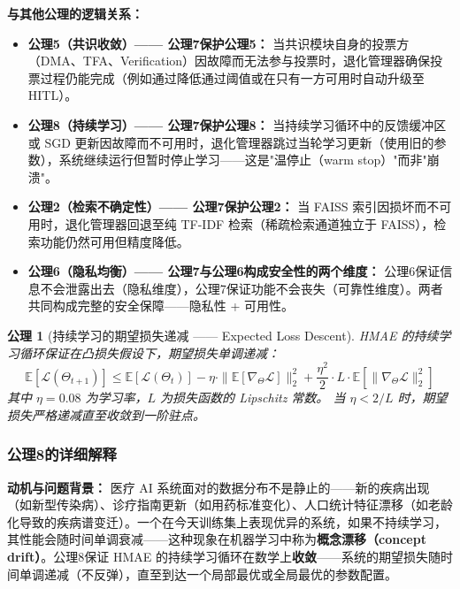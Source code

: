 \documentclass[11pt,a4paper]{ctexart}
\newtheorem{axiom}{公理}[section]
\theoremstyle{remark}
\begin{document}
\textbf{与其他公理的逻辑关系：}
\begin{itemize}[nosep]
\item \textbf{公理5（共识收敛）—— 公理7保护公理5：} 当共识模块自身的投票方（DMA、TFA、Verification）因故障而无法参与投票时，退化管理器确保投票过程仍能完成（例如通过降低通过阈值或在只有一方可用时自动升级至 HITL）。
\item \textbf{公理8（持续学习）—— 公理7保护公理8：} 当持续学习循环中的反馈缓冲区或 SGD 更新因故障而不可用时，退化管理器跳过当轮学习更新（使用旧的参数），系统继续运行但暂时停止学习——这是"温停止（warm stop）"而非"崩溃"。
\item \textbf{公理2（检索不确定性）—— 公理7保护公理2：} 当 FAISS 索引因损坏而不可用时，退化管理器回退至纯 TF-IDF 检索（稀疏检索通道独立于 FAISS），检索功能仍然可用但精度降低。
\item \textbf{公理6（隐私均衡）—— 公理7与公理6构成安全性的两个维度：} 公理6保证信息不会泄露出去（隐私维度），公理7保证功能不会丧失（可靠性维度）。两者共同构成完整的安全保障——隐私性 + 可用性。
\end{itemize}

\begin{axiom}[持续学习的期望损失递减 —— Expected Loss Descent]
\label{ax:learning}
HMAE 的持续学习循环保证在凸损失假设下，期望损失单调递减：
\begin{equation}
\mathbb{E}[\mathcal{L}(\Theta_{t+1})] \leq \mathbb{E}[\mathcal{L}(\Theta_t)] - \eta \cdot \|\mathbb{E}[\nabla_\Theta \mathcal{L}]\|_2^2 + \frac{\eta^2}{2} \cdot L \cdot \mathbb{E}[\|\nabla_\Theta \mathcal{L}\|_2^2]
\end{equation}
其中 $\eta = 0.08$ 为学习率，$L$ 为损失函数的 Lipschitz 常数。
当 $\eta < 2/L$ 时，期望损失严格递减直至收敛到一阶驻点。
\end{axiom}

\subsubsection{公理8的详细解释}

\textbf{动机与问题背景：} 医疗 AI 系统面对的数据分布不是静止的——新的疾病出现（如新型传染病）、诊疗指南更新（如用药标准变化）、人口统计特征漂移（如老龄化导致的疾病谱变迁）。一个在今天训练集上表现优异的系统，如果不持续学习，其性能会随时间单调衰减——这种现象在机器学习中称为\textbf{概念漂移（concept drift）}。公理8保证 HMAE 的持续学习循环在数学上\textbf{收敛}——系统的期望损失随时间单调递减（不反弹），直至到达一个局部最优或全局最优的参数配置。
\end{document}
